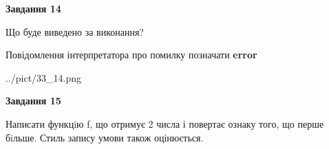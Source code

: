 \documentclass[11pt, ukrainian]{article}
\begin{document}
{\begin {large}
{\begin {center}\textbf{Завдання 14}\end {center}}\par
Що буде виведено за виконання? \par
Повідомлення інтерпретатора про помилку позначати \textbf{error}

\begin{center}
	{../pict/33_14.png}
\end{center}
\newpage

{\begin {center}\textbf{Завдання 15}\end {center}}\par

Написати функцiю f, що отримує 2 числа і повертає ознаку того, що перше бiльше. Стиль запису умови також оцінюється.\par
\newpage

\end {large}}
\end{document}
